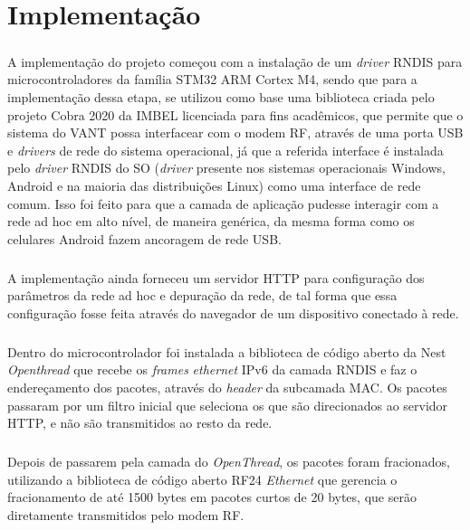 \chapter{Implementação}
\noindent

\paragraph{} A implementação do projeto começou com a instalação de um \textit{driver} RNDIS para microcontroladores da família STM32 ARM Cortex M4, sendo que para a implementação dessa etapa, se utilizou como base uma biblioteca criada pelo projeto Cobra 2020 da IMBEL \citep{cobra} licenciada para fins acadêmicos, que permite que o sistema do VANT possa interfacear com o modem RF, através de uma porta USB e \textit{drivers} de rede do sistema operacional, já que a referida interface é instalada pelo \textit{driver} RNDIS do SO (\textit{driver} presente nos sistemas operacionais Windows, Android e na maioria das distribuições Linux) como uma interface de rede comum. Isso foi feito para que a camada de aplicação pudesse interagir com a rede ad hoc em alto nível, de maneira genérica, da mesma forma como os celulares Android fazem ancoragem de rede USB. 

\paragraph{} A implementação ainda forneceu um servidor HTTP para configuração dos parâmetros da rede ad hoc e depuração da rede, de tal forma que essa configuração fosse feita através do navegador de um dispositivo conectado à rede.

\paragraph{} Dentro do microcontrolador foi instalada a biblioteca de código aberto da Nest \textit{Openthread} que recebe os \textit{frames} \textit{ethernet} IPv6 da camada RNDIS e faz o endereçamento dos pacotes, através do \textit{header} da subcamada MAC. Os pacotes passaram por um filtro inicial que seleciona os que são direcionados ao servidor HTTP, e não são transmitidos ao resto da rede. 

\paragraph{} Depois de passarem pela camada do \textit{OpenThread}, os pacotes foram fracionados, utilizando a biblioteca de código aberto RF24 \textit{Ethernet} que gerencia o fracionamento de até 1500 bytes em pacotes curtos de 20 bytes, que serão diretamente transmitidos pelo modem RF.

